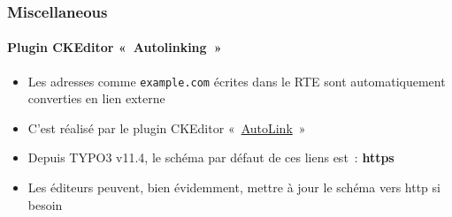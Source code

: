%

\begin{frame}[fragile]
	\frametitle{Miscellaneous}
	\framesubtitle{Plugin CKEditor «~Autolinking~»}


	\begin{itemize}
		\item Les adresses comme \texttt{example.com} écrites dans le RTE sont automatiquement
			converties en lien externe
		\item C'est réalisé par le plugin CKEditor
			«~\href{https://ckeditor.com/docs/ckeditor5/latest/features/link.html#autolink-feature}{AutoLink}~»
		\item Depuis TYPO3 v11.4, le schéma par défaut de ces liens est~: \textbf{https}
		\item Les éditeurs peuvent, bien évidemment, mettre à jour le schéma vers http si besoin
	\end{itemize}

\end{frame}

